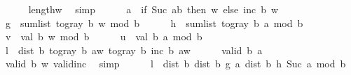 \begin{isabellebody}
\ \ \ \ \isamarkupfalse%
\ {\isachardoublequoteopen}{}{\isasymle}length{\isacharparenleft}{\kern0pt}w{\isacharparenright}{\kern0pt}{\isachardoublequoteclose}\ \isamarkupfalse%
\ simp\isanewline
\ \ \ \ \isamarkupfalse%
\ {\isacharquery}{\kern0pt}a\ {\isacharequal}{\kern0pt}\ {\isachardoublequoteopen}if\ Suc\ a{\isasymnoteq}b\ then\ w\ else\ inc\ b\ w{\isachardoublequoteclose}\isanewline
\ \ \ \ \isamarkupfalse%
\ {\isacharquery}{\kern0pt}g\ {\isacharequal}{\kern0pt}\ {\isachardoublequoteopen}sum{\isacharunderscore}{\kern0pt}list\ {\isacharparenleft}{\kern0pt}to{\isacharunderscore}{\kern0pt}gray\ b\ w{\isacharparenright}{\kern0pt}\ mod\ b{\isachardoublequoteclose}\isanewline
\ \ \ \ \isamarkupfalse%
\ {\isacharquery}{\kern0pt}h\ {\isacharequal}{\kern0pt}\ {\isachardoublequoteopen}sum{\isacharunderscore}{\kern0pt}list\ {\isacharparenleft}{\kern0pt}to{\isacharunderscore}{\kern0pt}gray\ b\ {\isacharquery}{\kern0pt}a{\isacharparenright}{\kern0pt}\ mod\ b{\isachardoublequoteclose}\isanewline
\ \ \ \ \isamarkupfalse%
\ {\isacharquery}{\kern0pt}v\ {\isacharequal}{\kern0pt}\ {\isachardoublequoteopen}val\ b\ w\ mod\ b{\isachardoublequoteclose}\isanewline
\ \ \ \ \isamarkupfalse%
\ {\isacharquery}{\kern0pt}u\ {\isacharequal}{\kern0pt}\ {\isachardoublequoteopen}val\ b\ {\isacharquery}{\kern0pt}a\ mod\ b{\isachardoublequoteclose}\isanewline
\ \ \ \ \isamarkupfalse%
\ {\isacharquery}{\kern0pt}l\ {\isacharequal}{\kern0pt}\ {\isachardoublequoteopen}dist\ b\ {\isacharparenleft}{\kern0pt}to{\isacharunderscore}{\kern0pt}gray\ b\ {\isacharparenleft}{\kern0pt}a{\isacharhash}{\kern0pt}w{\isacharparenright}{\kern0pt}{\isacharparenright}{\kern0pt}\ {\isacharparenleft}{\kern0pt}to{\isacharunderscore}{\kern0pt}gray\ b\ {\isacharparenleft}{\kern0pt}inc\ b\ {\isacharparenleft}{\kern0pt}a{\isacharhash}{\kern0pt}w{\isacharparenright}{\kern0pt}{\isacharparenright}{\kern0pt}{\isacharparenright}{\kern0pt}{\isachardoublequoteclose}\isanewline
\ \ \ \ \isamarkupfalse%
\ {\isachardoublequoteopen}valid\ b\ {\isacharquery}{\kern0pt}a{\isachardoublequoteclose}\ \isamarkupfalse%
\ {\isacartoucheopen}valid\ b\ w{\isacartoucheclose}\ valid{\isacharunderscore}{\kern0pt}inc\ \isamarkupfalse%
\ simp\isanewline
\ \ \ \ \isamarkupfalse%
\ {\isachardoublequoteopen}{\isacharquery}{\kern0pt}l\ {\isacharequal}{\kern0pt}\ dist{}\ b\ {\isacharparenleft}{\kern0pt}dist{}\ b\ {\isacharquery}{\kern0pt}g\ a{\isacharparenright}{\kern0pt}\ {\isacharparenleft}{\kern0pt}dist{}\ b\ {\isacharquery}{\kern0pt}h\ {\isacharparenleft}{\kern0pt}Suc\ a\ mod\ b{\isacharparenright}{\kern0pt}{\isacharparenright}{\kern0pt}\isanewline

\end{isabellebody}
